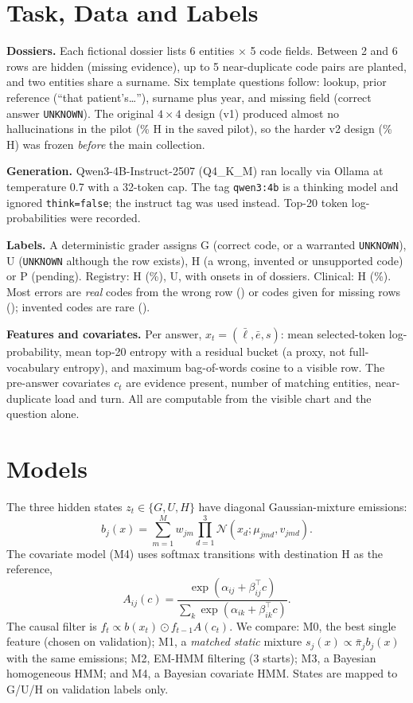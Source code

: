 \documentclass[conference]{IEEEtran}
\begin{document}
\section{Task, Data and Labels}
\textbf{Dossiers.} Each fictional dossier lists 6 entities $\times$ 5 code fields. Between 2 and 6 rows are hidden (missing evidence), up to 5 near-duplicate code pairs are planted, and two entities share a surname. Six template questions follow: lookup, prior reference (``that patient's\ldots''), surname plus year, and missing field (correct answer \texttt{UNKNOWN}). The original $4\times4$ design (v1) produced almost no hallucinations in the pilot (\PilotVone\% H in the saved pilot), so the harder v2 design (\PilotVtwo\% H) was frozen \emph{before} the main collection.

\textbf{Generation.} Qwen3-4B-Instruct-2507 (Q4\_K\_M) ran locally via Ollama at temperature 0.7 with a 32-token cap. The tag \texttt{qwen3:4b} is a thinking model and ignored \texttt{think=false}; the instruct tag was used instead. Top-20 token log-probabilities were recorded.

\textbf{Labels.} A deterministic grader assigns G (correct code, or a warranted \texttt{UNKNOWN}), U (\texttt{UNKNOWN} although the row exists), H (a wrong, invented or unsupported code) or P (pending). Registry: \NRegH{} H (\RegHpct\%), \NRegU{} U, with onsets in \NRegOnset{} of \NRegDossiers{} dossiers. Clinical: \NClinH{} H (\ClinHpct\%). Most errors are \emph{real} codes from the wrong row (\NRegWrong{}) or codes given for missing rows (\NRegMissCode{}); invented codes are rare (\NRegInvented{}).

\textbf{Features and covariates.} Per answer, $x_t=(\bar\ell,\bar e,s)$: mean selected-token log-probability, mean top-20 entropy with a residual bucket (a proxy, not full-vocabulary entropy), and maximum bag-of-words cosine to a visible row. The pre-answer covariates $c_t$ are evidence present, number of matching entities, near-duplicate load and turn. All are computable from the visible chart and the question alone.

\section{Models}
The three hidden states $z_t\in\{G,U,H\}$ have diagonal Gaussian-mixture emissions:
\begin{equation}
b_j(x)=\sum_{m=1}^{M} w_{jm}\prod_{d=1}^{3}\mathcal N(x_d;\mu_{jmd},v_{jmd}).
\end{equation}
The covariate model (M4) uses softmax transitions with destination H as the reference,
\begin{equation}
A_{ij}(c)=\frac{\exp(\alpha_{ij}+\beta_{ij}^{\top}c)}{\sum_k \exp(\alpha_{ik}+\beta_{ik}^{\top}c)} .
\end{equation}
The causal filter is $f_t\propto b(x_t)\odot f_{t-1}A(c_t)$. We compare: M0, the best single feature (chosen on validation); M1, a \emph{matched static} mixture $s_j(x)\propto\bar\pi_j b_j(x)$ with the same emissions; M2, EM-HMM filtering (3 starts); M3, a Bayesian homogeneous HMM; and M4, a Bayesian covariate HMM. States are mapped to G/U/H on validation labels only.
\end{document}
